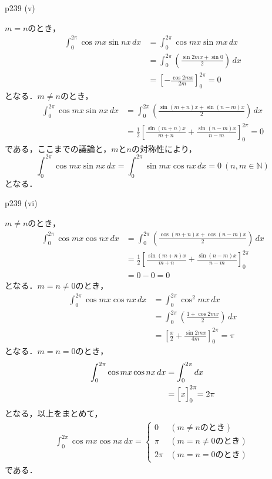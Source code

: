 \documentclass[dvipdfmx,uplatex,11pt]{jsarticle}
\theoremstyle{definition}
\begin{document}
	\begin{screen}
		p239 (v) \par 
		$m=n$のとき，
		\begin{align*}
			\int_{0}^{2\pi} \cos m x \sin nx \, dx & = \int_{0}^{2\pi} \cos mx \sin mx \, dx \\
			& = \int_{0}^{2\pi} \left (\frac{\sin 2mx + \sin 0}{2}\right ) \, dx \\
			& = \left [-\frac{\cos 2mx}{2m}\right ]_{0}^{2\pi} =0
		\end{align*}
		となる．$m \ne n$のとき，
		\begin{align*}
			\int_{0}^{2\pi} \cos mx \sin nx \, dx & = \int_{0}^{2\pi} \left (\frac{\sin (m+n)x + \sin (n-m)x}{2}\right) \, dx \\
			& = \frac{1}{2}\left [\frac{\sin (m+n)x}{m+n}+\frac{\sin (n-m)x}{n-m} \right]_{0}^{2\pi} =0
		\end{align*}
		である，ここまでの議論と，$m$と$n$の対称性により，
			\[
				\int_{0}^{2\pi} \cos mx \sin nx \, dx =\int_{0}^{2\pi} \sin mx \cos nx \, dx =0 ~(n,m \in \mathbb{N})
			\]
		となる．
	\end{screen}

	\begin{screen}
		p239 (vi) \par 
		$m \ne n$のとき，
		\begin{align*}
			\int_{0}^{2\pi} \cos mx \cos nx \, dx & = \int_{0}^{2\pi} \left (\frac{\cos(m+n)x+\cos(n-m)x}{2}\right) \, dx\\
			& = \frac{1}{2} \left [\frac{\sin (m+n)x}{m+n}+\frac{\sin(n-m)x}{n-m}\right]_{0}^{2\pi} \\
			& = 0-0 =0
		\end{align*}
		となる．$m =n \ne 0$のとき，
		\begin{align*}
			\int_{0}^{2\pi} \cos mx \cos nx \, dx & = \int_{0}^{2\pi} \cos^2 mx \, dx \\
			& = \int_{0}^{2\pi} \left (\frac{1+\cos 2mx}{2}\right) \, dx  \\
			& = \left [\frac{x}{2}+\frac{\sin 2mx}{4m}\right]_{0}^{2\pi} = \pi
		\end{align*}
		となる．$m =n =0$のとき，
		\begin{align*}
			\int_{0}^{2\pi} \cos mx \cos nx \, dx & = \int_{0}^{2\pi} dx \\
			& = \Bigl[x\Bigl]_{0}^{2\pi} = 2\pi
		\end{align*}
		となる，以上をまとめて，
		\begin{align*}
			\int_{0}^{2\pi} \cos mx \cos nx \, dx =
			\begin{cases}
				0 & (m \ne n のとき)\\
				\pi & (m = n\ne 0のとき)\\
				2 \pi & (m=n=0 のとき)
			\end{cases}
		\end{align*}
		である．
	\end{screen}
\end{document}
